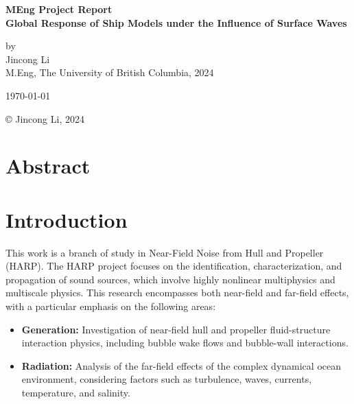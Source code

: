 \documentclass[12pt]{article} %
\begin{document}
\setlength{\parskip}{1em} 
\setlength{\parindent}{0pt}
\newcommand{\vect}[1]{\mathbf{#1}}

\begin{titlepage}  %
    \centering    %

    \vspace*{2cm}
    
    \normalsize \textbf{MEng Project Report} \\
    \vspace{0.5cm}  %
    \normalsize\textbf{Global Response of Ship Models under the Influence of Surface Waves} \\
    \vspace{2cm}  %
    
    \normalsize by\\
    \vspace{1cm}
    \normalsize Jincong Li \\ 
    \vspace{1cm}
    \normalsize M.Eng, The University of British Columbia, 2024
    \vspace{11cm}  %
    
    \normalsize \today

    \vfill  %
    © Jincong Li, 2024
\end{titlepage}
\tableofcontents
\newpage
\section{Abstract}

\section{Introduction}
This work is a branch of study in Near-Field Noise from Hull and Propeller (HARP). 
The HARP project focuses on the identification, characterization, and propagation of sound sources, which involve highly nonlinear multiphysics and multiscale physics. This research encompasses both near-field and far-field effects, with a particular emphasis on the following areas:

\begin{itemize}
    \item \textbf{Generation:} Investigation of near-field hull and propeller fluid-structure interaction physics, including bubble wake flows and bubble-wall interactions.
    \item \textbf{Radiation:} Analysis of the far-field effects of the complex dynamical ocean environment, considering factors such as turbulence, waves, currents, temperature, and salinity.
\end{itemize}
\end{document}
